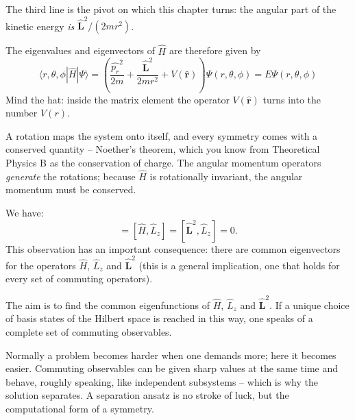 The third line is the pivot on which this chapter turns: the angular part of the kinetic energy \emph{is} $\widehat{\mathbf{L}}^2/(2mr^2)$.

The eigenvalues and eigenvectors of $\widehat{H}$ are therefore given by
\begin{equation}\label{eq:centralpotsse}
	\langle r,\theta,\phi|\widehat{H}|\Psi\rangle = \left(\frac{\widehat{p_r}^2}{2m} + \frac{\widehat{\mathbf{L}}^2}{2mr^2} + V(\widehat{\mathbf{r}})\right)\Psi(r,\theta,\phi) = E\Psi(r,\theta,\phi)
\end{equation}
Mind the hat: inside the matrix element the operator $V(\widehat{\mathbf{r}})$ turns into the number $V(r)$.

\begin{greybox}
	A rotation maps the system onto itself, and every symmetry comes with a conserved quantity -- Noether's theorem, which you know from Theoretical Physics B as the conservation of charge. The angular momentum operators \emph{generate} the rotations; because $\widehat{H}$ is rotationally invariant, the angular momentum must be conserved.
\end{greybox}

We have:
\begin{equation}
	[\widehat{H}, \widehat{\mathbf{L}}^2] = [\widehat{H}, \widehat{L}_z] = [\widehat{\mathbf{L}}^2,\widehat{L}_z] = 0.
\end{equation}
This observation has an important consequence: there are common eigenvectors for the operators $\widehat{H}$, $\widehat{L}_z$ and $\widehat{\mathbf{L}}^2$ (this is a general implication, one that holds for every set of commuting operators).

The aim is to find the common eigenfunctions of $\widehat{H}$, $\widehat{L}_z$ and $\widehat{\mathbf{L}}^2$. If a unique choice of basis states of the Hilbert space is reached in this way, one speaks of a complete set of commuting observables.

\begin{intuition}
	Normally a problem becomes harder when one demands more; here it becomes easier. Commuting observables can be given sharp values at the same time and behave, roughly speaking, like independent subsystems -- which is why the solution separates. A separation ansatz is no stroke of luck, but the computational form of a symmetry.
\end{intuition}

